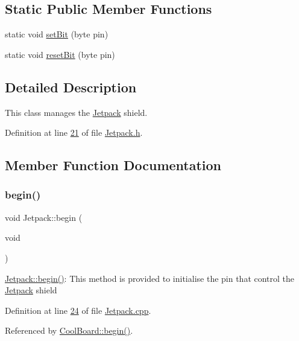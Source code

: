 \subsection*{Static Public Member Functions}
\begin{DoxyCompactItemize}
\item 
static void \hyperlink{class_jetpack_a910c9023313d3896fd71a8a55dceeaa2}{set\+Bit} (byte pin)
\item 
static void \hyperlink{class_jetpack_ad1142aa8d4d8d0528566a5dc1fe85d54}{reset\+Bit} (byte pin)
\end{DoxyCompactItemize}


\subsection{Detailed Description}
This class manages the \hyperlink{class_jetpack}{Jetpack} shield. 

Definition at line \hyperlink{_jetpack_8h_source_l00021}{21} of file \hyperlink{_jetpack_8h_source}{Jetpack.\+h}.



\subsection{Member Function Documentation}
\mbox{\label{class_jetpack_a5a53e1ebf7aaf3bf3e0d37ea64ca09a7}} 
\subsubsection{\texorpdfstring{begin()}{begin()}}
{\footnotesize\ttfamily void Jetpack\+::begin (\begin{DoxyParamCaption}\item[{void}]{ }\end{DoxyParamCaption})}

\hyperlink{class_jetpack_a5a53e1ebf7aaf3bf3e0d37ea64ca09a7}{Jetpack\+::begin()}\+: This method is provided to initialise the pin that control the \hyperlink{class_jetpack}{Jetpack} shield 

Definition at line \hyperlink{_jetpack_8cpp_source_l00024}{24} of file \hyperlink{_jetpack_8cpp_source}{Jetpack.\+cpp}.



Referenced by \hyperlink{_cool_board_8cpp_source_l00021}{Cool\+Board\+::begin()}.


